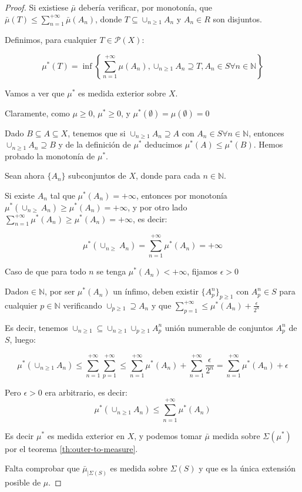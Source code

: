 \begin{proof}
 Si existiese $\bar{\mu}$ debería verificar, por monotonía, que $\bar{\mu}(T) \le \sum_{n=1}^{+\infty} \bar{\mu}(A_n)$, 
 donde $T \subseteq \cup_{n\ge 1} A_n$ y $A_n\in R$ son disjuntos.
 
 Definimos, para cualquier $T\in \mathcal{P}(X)$:
 
 \[\mu^\ast(T) = \inf\left\{\sum_{n=1}^{+\infty} \mu(A_n), \cup_{n\ge 1} A_n \supseteq T,
                 A_n\in S \forall n\in\mathbb{N}\right\}\]
                 
 Vamos a ver que $\mu^\ast$ es medida exterior sobre $X$.
 
 Claramente, como $\mu \ge 0$, $\mu^\ast \ge 0$, y $\mu^\ast(\emptyset) = \mu(\emptyset) = 0$
 
 Dado $B\subseteq A \subseteq X$, tenemos que si $\cup_{n\ge 1} A_n \supseteq A$ con $A_n\in S \forall n\in\mathbb{N}$,
 entonces $\cup_{n\ge 1} A_n \supseteq B$ y de la definición de $\mu^\ast$ deducimos $\mu^\ast(A) \le \mu^\ast(B)$.
 Hemos probado la monotonía de $\mu^\ast$.
 
 Sean ahora $\{A_n\}$ subconjuntos de $X$, donde para cada $n\in \mathbb{N}$.
 
 Si existe $A_n$ tal que $\mu^\ast(A_n) = +\infty$, entonces por monotonía 
 $\mu^\ast(\cup_{n\ge} A_n) \ge \mu^\ast(A_n) = +\infty$, y por otro lado 
 $\sum_{n=1}^{+\infty} \mu^\ast(A_n) \ge \mu^\ast(A_n) = +\infty$, es decir:

 \[\mu^\ast(\cup_{n\ge} A_n) = \sum_{n=1}^{+\infty} \mu^\ast(A_n) = +\infty\]
 
 Caso de que para todo $n$ se tenga $\mu^\ast(A_n) < +\infty$, fijamos $\epsilon > 0$
 
 Dado$n\in \mathbb{N}$, por ser $\mu^\ast(A_n)$ un ínfimo, deben existir $\{A_p^n\}_{p\ge 1}$ con 
 $A_p^n \in S$ para cualquier $p\in\mathbb{N}$ verificando $\cup_{p\ge 1} \supseteq A_n$ y que
 $\sum_{p=1}^{+\infty} \le \mu^\ast(A_n) + \frac{\epsilon}{2^n}$
 
 Es decir, tenemos $\cup_{n\ge 1} \subseteq \cup_{n\ge 1} \cup_{p\ge 1} A_p^n$ unión numerable
 de conjuntos $A_p^n$ de $S$, luego:
 
 \[\mu^\ast(\cup_{n\ge 1} A_n) \le \sum_{n=1}^{+\infty} \sum_{p=1}^{+\infty} \le 
   \sum_{n=1}^{+\infty}\mu^\ast(A_n) + \sum_{n=1}^{+\infty}\frac{\epsilon}{2^n} = 
   \sum_{n=1}^{+\infty}\mu^\ast(A_n) + \epsilon\]
 
 Pero $\epsilon > 0$ era arbitrario, es decir: 
 \[\mu^\ast(\cup_{n\ge 1} A_n) \le \sum_{n=1}^{+\infty}\mu^\ast(A_n)\]
 
 Es decir $\mu^\ast$ es medida exterior en $X$, y podemos tomar $\bar{\mu}$ medida sobre $\Sigma(\mu^\ast)$ por
 el teorema \ref{th:outer-to-measure}.
 
 Falta comprobar que $\bar{\mu}_{|\Sigma(S)}$ es medida sobre $\Sigma(S)$ y que es la única extensión posible de $\mu$.
\end{proof}



